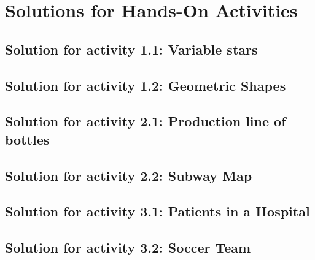 \chapter{Solutions for Hands-On Activities}

\newpage
\section{Solution for activity 1.1: Variable stars}


\newpage
\section{Solution for activity 1.2: Geometric Shapes}



\newpage
\section{Solution for activity  2.1: Production line of bottles}


\newpage
\section{Solution for activity  2.2: Subway Map}



\newpage
\section{Solution for activity  3.1: Patients in a Hospital}


\newpage
\section{Solution for activity  3.2: Soccer Team}


